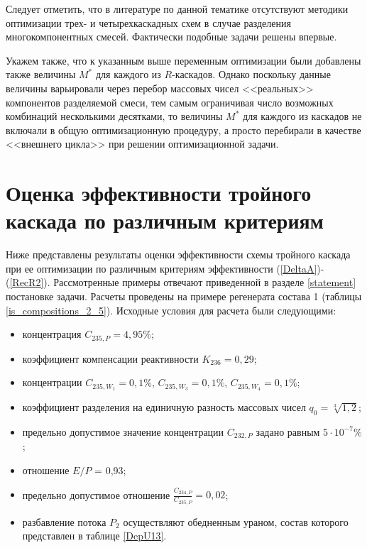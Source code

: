 Следует отметить, что в литературе по данной тематике отсутствуют методики оптимизации трех- и четырехкаскадных схем в случае разделения многокомпонентных смесей. Фактически подобные задачи решены впервые.

Укажем также, что к указанным выше переменным оптимизации были добавлены также величины $M^{*}$ для каждого из $R$-каскадов. Однако поскольку данные величины варьировали через перебор массовых чисел <<реальных>> компонентов разделяемой смеси, тем самым ограничивая число возможных комбинаций несколькими десятками, то величины  $M^{*}$ для каждого из каскадов не включали в общую оптимизационную процедуру, а просто перебирали в качестве <<внешнего цикла>> при решении оптимизационной задачи.

\section{Оценка эффективности тройного каскада по различным критериям}\label{MDKefficiency}

Ниже представлены результаты оценки эффективности схемы тройного каскада при ее оптимизации по различным критериям эффективности (\ref{DeltaA})-(\ref{RecR2}). Рассмотренные примеры отвечают приведенной в разделе \ref{statement} постановке задачи. Расчеты проведены на примере регенерата состава 1  (таблицы \ref{is_compositions_2_5}). Исходные условия для расчета были следующими:

\begin{itemize}
    \item концентрация $C_{235,{P}} = {4,95\%}$; 
    \item коэффициент компенсации реактивности $K_{236}=0,29$;
    \item концентрации $C_{235,{W_1}} = 0,1\%$, $C_{235,{W_3}} = 0,1\%$, $C_{235,{W_4}} = 0,1\%$;
    \item коэффициент разделения на единичную разность массовых чисел $q_{0} = \sqrt[3]{1,2}$;
    \item предельно допустимое значение концентрации $C_{232,{P}}$ задано равным $5\cdot10^{-7} \%$;
    \item отношение $E/P$ = 0,93;
    \item предельно допустимое отношение $\frac{C_{234,{P}}}{C_{235,{P}}} = 0,02$;
    \item разбавление потока $P_2$ осуществляют обедненным ураном, состав которого представлен в таблице \ref{DepU13}.
\end{itemize}

